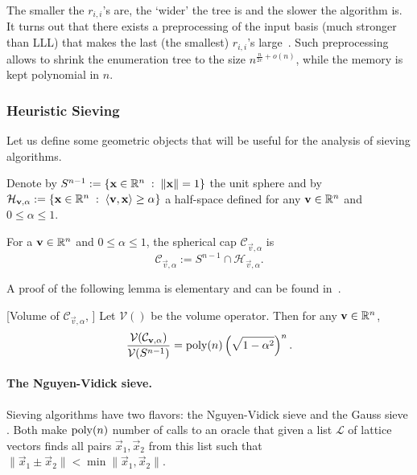 The smaller the $r_{i,i}$'s are, the `wider' the tree is and the slower the algorithm is. It turns out that there exists a preprocessing of the input basis (much stronger than LLL) that makes the last (the smallest) $r_{i,i}$'s large~\cite{Kan83,HanSte07}. Such preprocessing allows to shrink the enumeration tree to the size $n^{\frac{n}{2e}+o(n)}$, while the memory is kept polynomial in $n$.

\subsubsection{Heuristic Sieving}

Let us define some geometric objects that will be useful for the analysis of sieving algorithms.

Denote by $S^{n-1}:=\{ \mathbf x \in \mathbb{R}^n \; : \; \|\mathbf x \| = 1 \}$ the unit sphere and by $\mathcal{H}_{\mathbf v, \alpha}:=\{\mathbf x \in \mathbb{R}^n \; : \; \langle\mathbf v, \mathbf x \rangle \geq \alpha\}$ a half-space defined for any $\mathbf v \in \mathbb{R}^n$ and $0 \leq \alpha \leq 1$.

\begin{definition}
	For a $\mathbf v \in \mathbb{R}^n$ and $0 \leq \alpha \leq 1$, the spherical cap $\mathcal{C}_{\vec v, \alpha}$ is
	\[
		\mathcal{C}_{\vec v, \alpha} := S^{n-1} \cap \mathcal{H}_{\vec v, \alpha}.
	\]
	
\end{definition}

A proof of the following lemma is elementary and can be found in~\cite[Lemma~A.3]{MV10}. 
\begin{lemma}{[Volume of $\mathcal{C}_{\vec v, \alpha}$, \cite[Lemma~A.3]{MV10}]} \label{lem:cap_vol}
	Let $\mathcal{V}()$ be the volume operator. Then for any $\mathbf v \in \mathbb{R}^n$,
	\[
		\frac{\mathcal{V} (	\mathcal{C}_{\mathbf v, \alpha} ) }{\mathcal{V}(S^{n-1})} = \operatorname{poly}(n) \left( \sqrt{1-\alpha^2} \right)^n.
	\]

\end{lemma}

\paragraph{The Nguyen-Vidick sieve.} Sieving algorithms have two flavors: the Nguyen-Vidick sieve \cite{NV08} and the Gauss sieve \cite{MicVou10}. Both make $\operatorname{poly}(n)$ number of calls to an oracle that given a list $\mathcal{L}$ of lattice vectors finds all pairs $\vec{x}_1, \vec{x}_2$ from  this list such that $\| \vec{x}_1 \pm \vec{x}_2 \| < \min{ \| \vec{x}_1, \vec{x}_2\| }$. 


